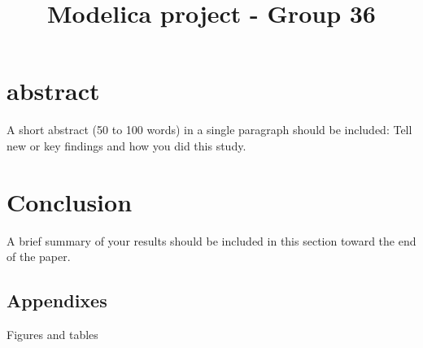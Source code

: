 \documentclass[
	10pt,				    %
	a4paper,         		%
	twocolumn,
	]{article}
\title{\Large \bf
Modelica project - Group 36}
\date{}
\author{\authorthing}
\begin{document}
\renewcommand\figurename{Fig.}

\setlength{\droptitle}{1.0cm}
\maketitle
\thispagestyle{empty}
\pagestyle{empty}

\normalsize

\section*{abstract}
A short abstract (50 to 100 words) in a single paragraph should be included: Tell new or key findings and how you did this study.    
%
%

%
%

%
%

%
%

%
%

%
%

%
%
\section*{Conclusion}
A brief summary of your results should be included in this section toward the end of the paper.
%
%
\begin{appendices}
\section*{Appendixes}
Figures and tables 

\end{appendices}
\end{document}

